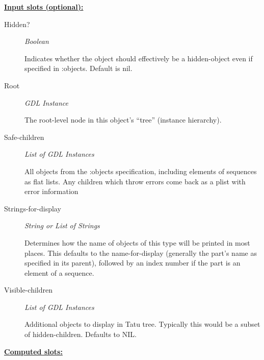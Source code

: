 \documentclass [11pt]{book}
\begin{document}
\begin{itemize}
\begin{description}
\end{description}








\textbf{
\underline{Input slots (optional):}}

\begin{description}

\item [Hidden?]
\emph{Boolean}

 Indicates whether the object should effectively be a hidden-object even if specified in :objects. Default is nil.




\item [Root]
\emph{GDL Instance}

 The root-level node in this object's ``tree'' (instance hierarchy).




\item [Safe-children]
\emph{List of GDL Instances}

 All objects from the :objects specification, including elements of sequences
as flat lists. Any children which throw errors come back as a plist with error information




\item [Strings-for-display]
\emph{String or List of Strings}

 Determines how the name of objects of
this type will be printed in most places.  This defaults to the
name-for-display (generally the part's name as specified in its
parent), followed by an index number if the part is an element of a
sequence.




\item [Visible-children]
\emph{List of GDL Instances}

 Additional objects to display in Tatu
tree. Typically this would be a subset of
hidden-children. Defaults to NIL.




\end{description}






\textbf{
\underline{Computed slots:}}


\end{itemize}
\end{document}
